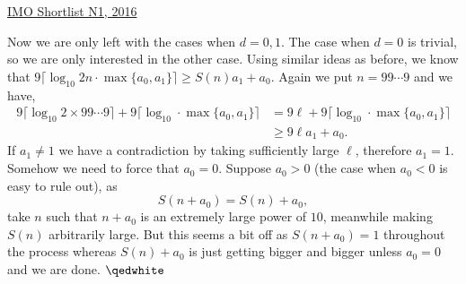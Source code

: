 \begin{problem}{1}{\href{https://artofproblemsolving.com/community/c6h1480723p34885693}{IMO Shortlist N1, 2016}}
\begin{solution}
	\indent Now we are only left with the cases when $d=0,1$. The case when $d=0$ is trivial, so we are only interested in the other case. Using similar ideas as before, we know that $9\lceil \log_{10}2n\cdot\max\{a_0,a_1\}\rceil\ge S(n)a_1+a_0$. Again we put $n=99\cdots 9$ and we have,
\begin{align*}
9\lceil \log_{10}2\times 99\cdots9\rceil + 9\lceil \log_{10}\cdot\max\{a_0,a_1\}\rceil &=9\ell+9\lceil \log_{10}\cdot\max\{a_0,a_1\}\rceil \\
&\ge 9\ell a_1+a_0.
\end{align*}
	If $a_1\ne 1$ we have a contradiction by taking sufficiently large $\ell$, therefore $a_1=1$. Somehow we need to force that $a_0=0$. Suppose $a_0>0$ (the case when $a_0<0$ is easy to rule out), as$$S(n+a_0)=S(n)+a_0,$$take $n$ such that $n+a_0$ is an extremely large power of $10$, meanwhile making $S(n)$ arbitrarily large. But this seems a bit off as $S(n+a_0)=1$ throughout the process whereas $S(n)+a_0$ is just getting bigger and bigger unless $a_0=0$ and we are done. $\qedwhite$

	\end{solution}
\end{problem}
	
